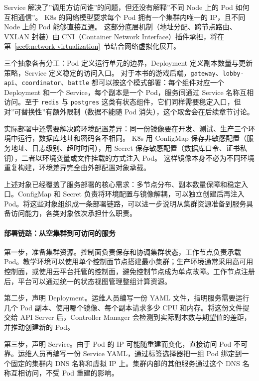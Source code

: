 Service 解决了”调用方访问谁”的问题，但还没有解释”不同 Node 上的 Pod 如何互相通信”。
K8s 的网络模型要求每个 Pod 拥有一个集群内唯一的 IP，且不同 Node 上的 Pod 能够直接互通。
这部分底层机制（地址分配、跨节点路由、VXLAN 封装）由 CNI（Container Network Interface）插件承担，将在第~\ref{sec6:network-virtualization}~节结合网络虚拟化展开。

三个抽象各有分工：Pod 定义运行单元的边界，Deployment 定义副本数量与更新策略，Service 定义稳定的访问入口。
对于本书的游戏后端，\texttt{gateway}、\texttt{lobby-api}、\texttt{coordinator}、\texttt{battle} 都可以按这个模式部署：每个组件对应一个 Deployment 和一个 Service，每个副本是一个 Pod，服务间通过 Service 名称互相访问。至于 \texttt{redis} 与 \texttt{postgres} 这类有状态组件，它们同样需要稳定入口，但对”可替换性”有额外限制（数据不能随 Pod 消失），这个取舍会在后续章节讨论。

实际部署中还需要解决跨环境配置差异：同一份镜像要在开发、测试、生产三个环境中运行，数据库地址和密码各不相同。
K8s 用 ConfigMap 保存非敏感配置（服务地址、日志级别、超时时间），用 Secret 保存敏感配置（数据库口令、证书私钥），二者以环境变量或文件挂载的方式注入 Pod。
这样镜像本身不必为不同环境重复构建，环境差异完全由外部配置对象承载。

上述对象已经覆盖了服务部署的核心需求：多节点分布、副本数量保障和稳定入口。ConfigMap 和 Secret 负责将环境配置与镜像解耦，可以独立创建后再注入 Pod。将这些对象组织成一条部署链路，可以进一步说明从集群资源准备到服务具备访问能力，各类对象依次承担什么职责。

\paragraph{部署链路：从空集群到可访问的服务}

第一步，准备集群资源。控制面负责保存和协调集群状态，工作节点负责承载 Pod。教学环境可以使用单个控制面节点搭建最小集群；生产环境通常采用高可用控制面，或使用云平台托管的控制面，避免控制节点成为单点故障。工作节点注册后，平台可以通过统一的状态视图管理整组计算资源。

第二步，声明 Deployment。运维人员编写一份 YAML 文件，指明服务需要运行几个 Pod 副本、使用哪个镜像、每个副本请求多少 CPU 和内存。将这份文件提交给 API Server 后，Controller Manager 会检测到实际副本数与期望值的差距，并推动创建新的 Pod。

第三步，声明 Service。由于 Pod 的 IP 可能随重建而变化，直接访问 Pod 不可靠。运维人员再编写一份 Service YAML，通过标签选择器把一组 Pod 绑定到一个固定的集群内 DNS 名称和虚拟 IP 上。集群内部的其他服务通过这个 DNS 名称互相访问，不受 Pod 重建的影响。


